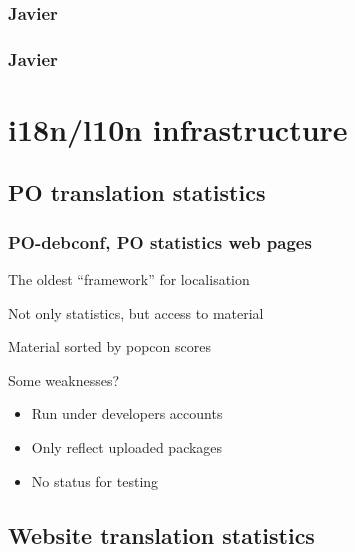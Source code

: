 \documentclass{beamer}
\begin{document}
\begin{frame}
  \frametitle{Javier}
\end{frame}

\begin{frame}
  \frametitle{Javier}
\end{frame}

\section{i18n/l10n infrastructure}

\subsection{PO translation statistics}

\begin{frame}
  \frametitle{PO-debconf, PO statistics web pages}
	\begin{block}
		{The oldest ``framework'' for localisation}
	\end{block}
	\begin{block}
		{Not only statistics, but access to material}
	\end{block}
	\begin{block}
		{Material sorted by popcon scores}
	\end{block}
	\begin{block}
		{Some weaknesses?}
		\begin{itemize}
		\item
			Run under developers accounts
		\item
			Only reflect uploaded packages
		\item
			No status for testing
		\end{itemize}
	\end{block}
\end{frame}



\subsection{Website translation statistics}
\end{document}
